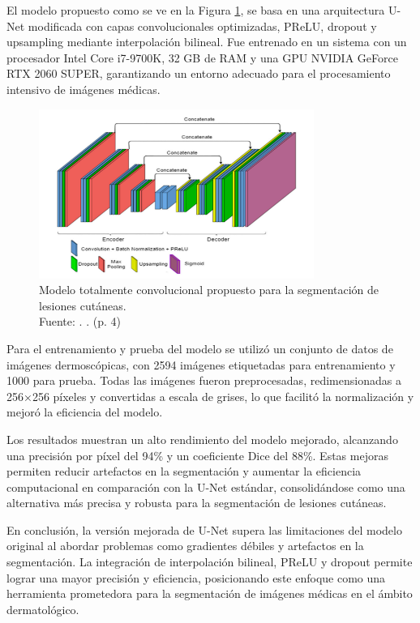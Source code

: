 El modelo propuesto como se ve en la Figura \ref{2:fig6}, se basa en una arquitectura U-Net modificada con capas convolucionales optimizadas, PReLU, dropout y upsampling mediante interpolación bilineal. Fue entrenado en un sistema con un procesador Intel Core i7-9700K, 32 GB de RAM y una GPU NVIDIA GeForce RTX 2060 SUPER, garantizando un entorno adecuado para el procesamiento intensivo de imágenes médicas.

\begin{figure}[!ht]
	\begin{center}
		\includegraphics[width=0.80\textwidth]{2/figures/segmentation1.png}
		\caption[Modelo totalmente convolucional propuesto para la segmentación de lesiones cutáneas]{Modelo totalmente convolucional propuesto para la segmentación de lesiones cutáneas.\\
			Fuente: \cite{karshiev2020improved}. . (p. 4)}
		\label{2:fig6}
	\end{center}
\end{figure}

Para el entrenamiento y prueba del modelo se utilizó un conjunto de datos de imágenes dermoscópicas, con 2594 imágenes etiquetadas para entrenamiento y 1000 para prueba. Todas las imágenes fueron preprocesadas, redimensionadas a 256×256 píxeles y convertidas a escala de grises, lo que facilitó la normalización y mejoró la eficiencia del modelo.

Los resultados muestran un alto rendimiento del modelo mejorado, alcanzando una precisión por píxel del 94\% y un coeficiente Dice del 88\%. Estas mejoras permiten reducir artefactos en la segmentación y aumentar la eficiencia computacional en comparación con la U-Net estándar, consolidándose como una alternativa más precisa y robusta para la segmentación de lesiones cutáneas.

En conclusión, la versión mejorada de U-Net supera las limitaciones del modelo original al abordar problemas como gradientes débiles y artefactos en la segmentación. La integración de interpolación bilineal, PReLU y dropout permite lograr una mayor precisión y eficiencia, posicionando este enfoque como una herramienta prometedora para la segmentación de imágenes médicas en el ámbito dermatológico.

